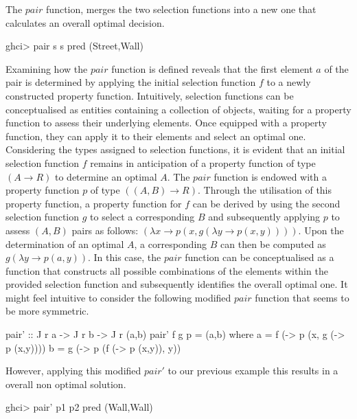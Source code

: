 \documentclass[runningheads]{llncs}
\begin{document}
The \(pair\) function, merges the two selection functions into a new one
that calculates an overall optimal decision.

\begin{haskell}
ghci> pair s s pred
(Street,Wall)
\end{haskell}

Examining how the \(pair\) function is defined reveals that the first
element \(a\) of the pair is determined by applying the initial
selection function \(f\) to a newly constructed property function.
Intuitively, selection functions can be conceptualised as entities
containing a collection of objects, waiting for a property function to
assess their underlying elements. Once equipped with a property
function, they can apply it to their elements and select an optimal one.
Considering the types assigned to selection functions, it is evident
that an initial selection function \(f\) remains in anticipation of a
property function of type \((A \rightarrow R)\) to determine an optimal
\(A\). The \(pair\) function is endowed with a property function \(p\)
of type \(((A,B) \rightarrow R)\). Through the utilisation of this
property function, a property function for \(f\) can be derived by using
the second selection function \(g\) to select a corresponding \(B\) and
subsequently applying \(p\) to assess \((A,B)\) pairs as follows:
\((\lambda x \rightarrow p (x, g (\lambda y \rightarrow p (x,y))))\).
Upon the determination of an optimal \(A\), a corresponding \(B\) can
then be computed as \(g (\lambda y \rightarrow p (a,y))\). In this case,
the \(pair\) function can be conceptualised as a function that
constructs all possible combinations of the elements within the provided
selection function and subsequently identifies the overall optimal one.
It might feel intuitive to consider the following modified \(pair\)
function that seems to be more symmetric.

\begin{code}
pair' :: J r a -> J r b -> J r (a,b)
pair' f g p = (a,b)
  where
      a = f (\x -> p (x, g (\y -> p (x,y))))
      b = g (\y -> p (f (\x -> p (x,y)), y))
\end{code}

However, applying this modified \(pair'\) to our previous example this
results in a overall non optimal solution.

\begin{haskell}
ghci> pair' p1 p2 pred
(Wall,Wall)
\end{haskell}
\end{document}
